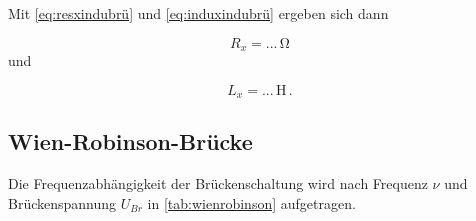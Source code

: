 Mit \eqref{eq:resxindubrü} und \eqref{eq:induxindubrü} ergeben sich dann

\begin{equation*}
  R_x = ... \,\unit{\ohm}
\end{equation*} und

\begin{equation*}
  L_x = ... \,\unit{\henry} \,.
\end{equation*}

\newpage

\subsection{Wien-Robinson-Brücke}

Die Frequenzabhängigkeit der Brückenschaltung wird nach Frequenz $ν$ und Brückenspannung $U_{Br}$ in
\autoref{tab:wienrobinson} aufgetragen.

